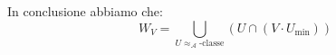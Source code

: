 \documentclass[12pt]{article}
\begin{document}
\medskip

In conclusione abbiamo che: $$W_V = \bigcup_{U\approx_\mathcal{A}\textrm{-classe}} (U \cap (V \cdot U_{\textrm{min}}))$$

%   
%
%   
\end{document}
